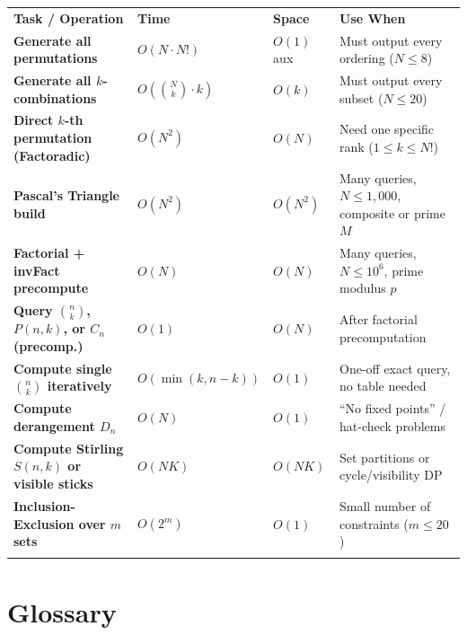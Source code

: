 \documentclass[11pt,a4paper]{article}
\theoremstyle{definition}
\begin{document}
\begingroup\small{}
\begin{tabularx}{\textwidth}{>{\raggedright\arraybackslash\bfseries}p{4.6cm} >{\centering\arraybackslash}p{1.8cm} >{\centering\arraybackslash}p{1.5cm} >{\raggedright\arraybackslash}X}
\arrayrulecolor{primaryblue}\toprule[1.2pt]
\rowcolor{primaryblue!10}
\textcolor{primaryblue}{\textbf{Task / Operation}} & \textcolor{primaryblue}{\textbf{Time}} & \textcolor{primaryblue}{\textbf{Space}} & \textcolor{primaryblue}{\textbf{Use When}} \\
\arrayrulecolor{codeframe}\midrule[0.6pt]
Generate all permutations & $O(N \cdot N!)$ & $O(1)$ aux & Must output every ordering ($N \le 8$) \\
Generate all $k$-combinations & $O(\binom{N}{k} \cdot k)$ & $O(k)$ & Must output every subset ($N \le 20$) \\
Direct $k$-th permutation (Factoradic) & $O(N^2)$ & $O(N)$ & Need one specific rank ($1 \le k \le N!$) \\
Pascal's Triangle build & $O(N^2)$ & $O(N^2)$ & Many queries, $N \le 1{,}000$, composite or prime $M$ \\
Factorial + invFact precompute & $O(N)$ & $O(N)$ & Many queries, $N \le 10^6$, prime modulus $p$ \\
Query $\binom{n}{k}$, $P(n,k)$, or $C_n$ (precomp.) & $O(1)$ & $O(N)$ & After factorial precomputation \\
Compute single $\binom{n}{k}$ iteratively & $O(\min(k, n-k))$ & $O(1)$ & One-off exact query, no table needed \\
Compute derangement $D_n$ & $O(N)$ & $O(1)$ & ``No fixed points'' / hat-check problems \\
Compute Stirling $S(n, k)$ or visible sticks & $O(NK)$ & $O(NK)$ & Set partitions or cycle/visibility DP \\
Inclusion-Exclusion over $m$ sets & $O(2^m)$ & $O(1)$ & Small number of constraints ($m \le 20$) \\
\arrayrulecolor{primaryblue}\bottomrule[1.2pt]
\end{tabularx}\endgroup

\section{Glossary}
\end{document}
